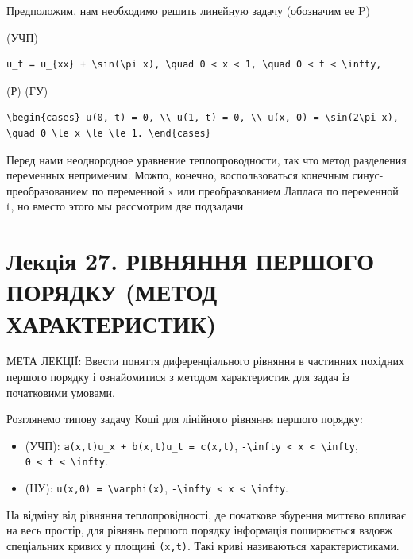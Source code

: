 \documentclass[
  ukrainian,
]{article}
\providecommand{\tightlist}{%
  \setlength{\itemsep}{0pt}\setlength{\parskip}{0pt}}
\begin{document}
Предположим, нам необходимо решить линейную задачу (обозначим ее P)

(УЧП)

\begin{verbatim}
u_t = u_{xx} + \sin(\pi x), \quad 0 < x < 1, \quad 0 < t < \infty,
\end{verbatim}

(Р) (ГУ)

\begin{verbatim}
\begin{cases} u(0, t) = 0, \\ u(1, t) = 0, \\ u(x, 0) = \sin(2\pi x), \quad 0 \le x \le \le 1. \end{cases}
\end{verbatim}

Перед нами неоднородное уравнение теплопроводности, так что метод
разделения переменных неприменим. Можпо, конечно, воспользоваться
конечным синус-преобразованием по переменной x или преобразованием
Лапласа по переменной t, но вместо этого мы рассмотрим две подзадачи

\section{Лекція 27. РІВНЯННЯ ПЕРШОГО ПОРЯДКУ (МЕТОД
ХАРАКТЕРИСТИК)}\label{ux43bux435ux43aux446ux456ux44f-27.-ux440ux456ux432ux43dux44fux43dux43dux44f-ux43fux435ux440ux448ux43eux433ux43e-ux43fux43eux440ux44fux434ux43aux443-ux43cux435ux442ux43eux434-ux445ux430ux440ux430ux43aux442ux435ux440ux438ux441ux442ux438ux43a}

МЕТА ЛЕКЦІЇ: Ввести поняття диференціального рівняння в частинних
похідних першого порядку і ознайомитися з методом характеристик для
задач із початковими умовами.

Розглянемо типову задачу Коші для лінійного рівняння першого порядку:

\begin{itemize}
\tightlist
\item
  (УЧП): \texttt{a(x,t)u\_x\ +\ b(x,t)u\_t\ =\ c(x,t)},
  \texttt{-\textbackslash{}infty\ \textless{}\ x\ \textless{}\ \textbackslash{}infty},
  \texttt{0\ \textless{}\ t\ \textless{}\ \textbackslash{}infty}.
\item
  (НУ): \texttt{u(x,0)\ =\ \textbackslash{}varphi(x)},
  \texttt{-\textbackslash{}infty\ \textless{}\ x\ \textless{}\ \textbackslash{}infty}.
\end{itemize}

На відміну від рівняння теплопровідності, де початкове збурення миттєво
впливає на весь простір, для рівнянь першого порядку інформація
поширюється вздовж спеціальних кривих у площині \texttt{(x,t)}. Такі
криві називаються характеристиками.
\end{document}
